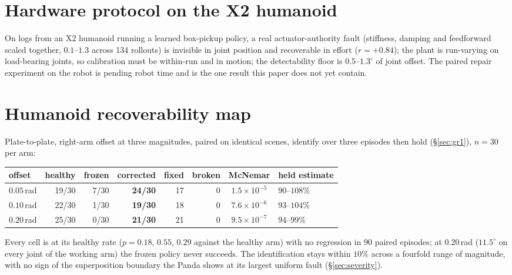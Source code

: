 \documentclass{article}
\begin{document}
\section{Hardware protocol on the X2 humanoid}
\label{app:hw}
On logs from an X2 humanoid running a learned box-pickup policy, a real actuator-authority
fault (stiffness, damping and feedforward scaled together, $0.1$--$1.3$ across 134
rollouts) is invisible in joint position and recoverable in effort ($r=+0.84$); the plant
is run-varying on load-bearing joints, so calibration must be within-run and in motion; the
detectability floor is $0.5$--$1.3^\circ$ of joint offset. The paired repair experiment on
the robot is pending robot time and is the one result this paper does not yet contain.

\section{Humanoid recoverability map}
\label{app:gr1map}
Plate-to-plate, right-arm offset at three magnitudes, paired on identical scenes, identify
over three episodes then hold (\S\ref{sec:gr1}), $n=30$ per arm:

\begin{center}\small
\begin{tabular}{lrrrrrcl}
\toprule
offset & healthy & frozen & corrected & fixed & broken & McNemar & held estimate \\
\midrule
$0.05$\,rad & 19/30 & 7/30 & \textbf{24/30} & 17 & 0 & $1.5\times10^{-5}$ & $90$--$108\%$ \\
$0.10$\,rad & 22/30 & 1/30 & \textbf{19/30} & 18 & 0 & $7.6\times10^{-6}$ & $93$--$104\%$ \\
$0.20$\,rad & 25/30 & 0/30 & \textbf{21/30} & 21 & 0 & $9.5\times10^{-7}$ & $94$--$99\%$ \\
\bottomrule
\end{tabular}
\end{center}

Every cell is at its healthy rate ($p=0.18$, $0.55$, $0.29$ against the healthy arm) with no
regression in 90 paired episodes; at $0.20$\,rad ($11.5^\circ$ on every joint of the working
arm) the frozen policy never succeeds. The identification stays within $10\%$ across a
fourfold range of magnitude, with no sign of the superposition boundary the Panda shows at
its largest uniform fault (\S\ref{sec:severity}).
\end{document}

